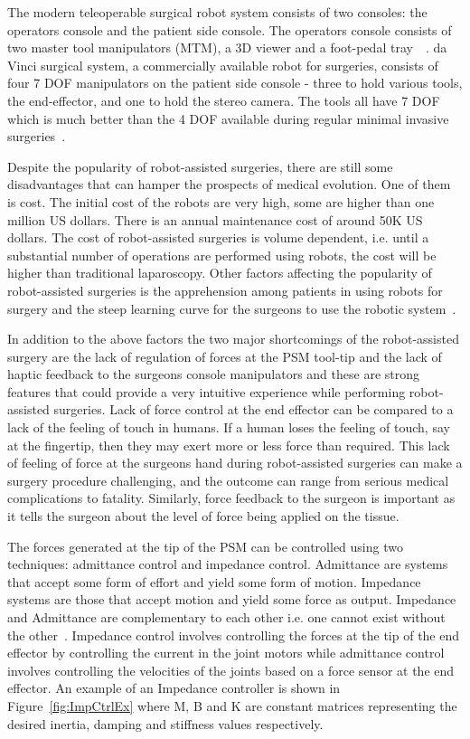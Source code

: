 \documentclass[10pt,journal,compsoc]{IEEEtran}
\begin{document}
The modern teleoperable surgical robot system consists of two consoles: the operator\textquotesingle s console and the patient side console. The operator\textquotesingle s console consists of two master tool manipulators (MTM), a 3D viewer and a foot-pedal tray~\cite{davinci}~\cite{davinciwiki}. da Vinci surgical system, a commercially available robot for surgeries, consists of four 7 DOF manipulators on the patient side console - three to hold various tools, the end-effector, and one to hold the stereo camera. The tools all have 7 DOF which is much better than the 4 DOF available during regular minimal invasive surgeries~\cite{vendittelli2008}.

Despite the popularity of robot-assisted surgeries, there are still some disadvantages that can hamper the prospects of medical evolution. One of them is cost. The initial cost of the robots are very high, some are higher than one million US dollars. There is an annual maintenance cost of around 50K US dollars.  The cost of robot-assisted surgeries is volume dependent, i.e. until a substantial number of operations are performed using robots, the cost will be higher than traditional laparoscopy. Other factors affecting the popularity of robot-assisted surgeries is the apprehension among patients in using robots for surgery and the steep learning curve for the surgeons to use the robotic system~\cite{interview}.

In addition to the above factors the two major shortcomings of the robot-assisted surgery are the lack of regulation of forces at the PSM tool-tip and the lack of haptic feedback to the surgeon\textquotesingle s console manipulators and these are strong features that could provide a very intuitive experience while performing robot-assisted surgeries. Lack of force control at the end effector can be compared to a lack of the feeling of touch in humans. If a human loses the feeling of touch, say at the fingertip, then they may exert more or less force than required. This lack of feeling of force at the surgeon\textquotesingle s hand during robot-assisted surgeries can make a surgery procedure challenging, and the outcome can range from serious medical complications to fatality. Similarly, force feedback to the surgeon is important as it tells the surgeon about the level of force being applied on the tissue.

The forces generated at the tip of the PSM can be controlled using two techniques: admittance control and impedance control. Admittance are systems that accept some form of effort and yield some form of motion. Impedance systems are those that accept motion and yield some force as output. Impedance and Admittance are complementary to each other i.e. one cannot exist without the other~\cite{hogan1984}. Impedance control involves controlling the forces at the tip of the end effector by controlling the current in the joint motors while admittance control involves controlling the velocities of the joints based on a force sensor at the end effector. 
An example of an Impedance controller is shown in Figure~\ref{fig:ImpCtrlEx} where M, B and K are constant matrices representing the desired inertia, damping and stiffness values respectively.
\end{document}
